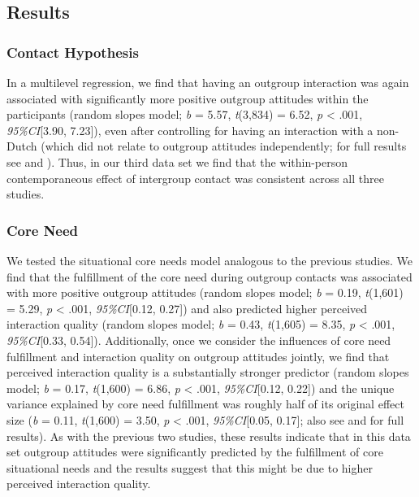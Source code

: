 \subsection{Results}

\subsubsection{Contact Hypothesis}

In a multilevel regression, we find that having an outgroup interaction
was again associated with significantly more positive outgroup attitudes
within the participants (random slopes model; \textit{b} = 5.57,
\textit{t}(3,834) = 6.52, \textit{p} \textless{} .001,
\textit{95\%CI}{[}3.90, 7.23{]}), even after controlling for having an
interaction with a non-Dutch (which did not relate to outgroup attitudes
independently; for full results see
 and
). Thus, in our third data set we find
that the within-person contemporaneous effect of intergroup contact was
consistent across all three studies.

\subsubsection{Core Need}

We tested the situational core needs model analogous to the previous
studies. We find that the fulfillment of the core need during outgroup
contacts was associated with more positive outgroup attitudes (random
slopes model; \textit{b} = 0.19, \textit{t}(1,601) = 5.29, \textit{p}
\textless{} .001, \textit{95\%CI}{[}0.12, 0.27{]}) and also predicted
higher perceived interaction quality (random slopes model; \textit{b} =
0.43, \textit{t}(1,605) = 8.35, \textit{p} \textless{} .001,
\textit{95\%CI}{[}0.33, 0.54{]}). Additionally, once we consider the
influences of core need fulfillment and interaction quality on outgroup
attitudes jointly, we find that perceived interaction quality is a
substantially stronger predictor (random slopes model; \textit{b} =
0.17, \textit{t}(1,600) = 6.86, \textit{p} \textless{} .001,
\textit{95\%CI}{[}0.12, 0.22{]}) and the unique variance explained by
core need fulfillment was roughly half of its original effect size
(\textit{b} = 0.11, \textit{t}(1,600) = 3.50, \textit{p} \textless{}
.001, \textit{95\%CI}{[}0.05, 0.17{]}; also see
 and  for
full results). As with the previous two studies, these results indicate
that in this data set outgroup attitudes were significantly predicted by
the fulfillment of core situational needs and the results suggest that
this might be due to higher perceived interaction quality.

